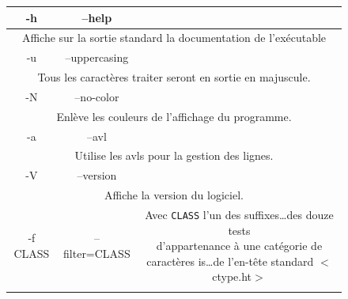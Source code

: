 \documentclass[12pt]{article}
\begin{document}
    \begin{figure}[H]  
         
        \centering
        \begin{tabular}{|c|c|c|}
            \hline
                \cellcolor{blue-s!25} -h & \cellcolor{blue-s!25} --help  &
                \cellcolor{blue-t!70}\\
            \hline
                \multicolumn{3}{|c|}{\cellcolor{blue-u!7}Affiche sur la sortie 
                standard la documentation de l'exécutable}\\
            \hline
                \cellcolor{blue-s!25} -u  & \cellcolor{blue-s!25} --uppercasing 
                & \cellcolor{blue-t!70} \\
            \hline
                \multicolumn{3}{|c|}{\cellcolor{blue-u!7}Tous les caractères 
                traiter seront en sortie en majuscule.}\\
            \hline 
                \cellcolor{blue-s!25} -N & \cellcolor{blue-s!25} --no-color  & 
                \cellcolor{blue-t!70} \\
            \hline
                \multicolumn{3}{|c|}{\cellcolor{blue-u!7}Enlève les couleurs de 
                l'affichage du programme.}\\
            \hline
                \cellcolor{blue-s!25} -a & \cellcolor{blue-s!25} --avl & 
                \cellcolor{blue-t!70} \\
            \hline
                \multicolumn{3}{|c|}{\cellcolor{blue-u!7}Utilise les avls pour 
                la gestion des lignes.}\\
            \hline
                \cellcolor{blue-s!25} -V & \cellcolor{blue-s!25} --version & 
                \cellcolor{blue-t!70} \\
            \hline
                \multicolumn{3}{|c|}{\cellcolor{blue-u!7}Affiche la version du  
                logiciel.}\\
            \hline
                \cellcolor{blue-s!25} -f CLASS & \cellcolor{blue-s!25} 
                --filter=CLASS & \rule{0pt}{2.6em}\cellcolor{blue-s!25}
                {\parbox{9cm}{ Avec \texttt{CLASS} l’un des 
                suffixes\ldots des douze tests\\ d’appartenance à une catégorie 
                de caractères is\ldots de l’en-tête standard $<$ctype.ht$>$}} \\
                [1.3em]
            \hline
                \multicolumn{3}{|c|}{\cellcolor{blue-u!7}\rule{0pt}{2em}
}
\end{tabular}
\end{figure}
\end{document}
